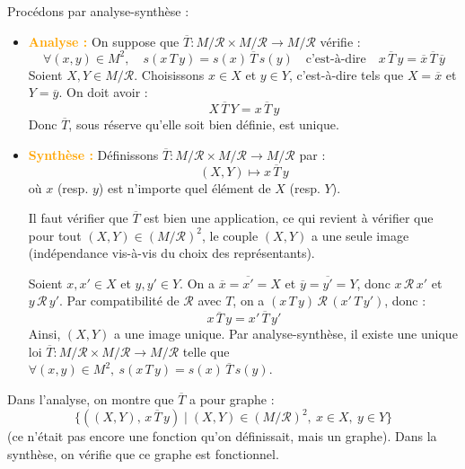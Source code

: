 \documentclass[a4paper,11pt]{article}
\newcommand{\cas}[1]{\textbf{\textcolor{orange}{#1}}}
\begin{document}
\begin{demonstration}
Procédons par analyse-synthèse :
\begin{itemize}
    \item \cas{Analyse :} On suppose que $\overline{T} : M / \mathcal{R} \times M / \mathcal{R} \to M / \mathcal{R}$ vérifie :
    \[
    \forall (x, y) \in M^2, \quad s(x \, T \, y) = s(x) \, \overline{T} \, s(y) \quad \text{c'est-à-dire} \quad \overline{x \, T \, y} = \overline{x} \, \overline{T} \, \overline{y}
    \]
    Soient $X, Y \in M / \mathcal{R}$. Choisissons $x \in X$ et $y \in Y$, c'est-à-dire tels que $X = \overline{x}$ et $Y = \overline{y}$.
    On doit avoir :
    \[
    X \, \overline{T} \, Y = \overline{x \, T \, y}
    \]
    Donc $\overline{T}$, sous réserve qu'elle soit bien définie, est unique.

    \item \cas{Synthèse :} Définissons $\overline{T} : M / \mathcal{R} \times M / \mathcal{R} \to M / \mathcal{R}$ par :
    \[
    (X, Y) \longmapsto \overline{x \, T \, y}
    \]
    où $x$ (resp. $y$) est n'importe quel élément de $X$ (resp. $Y$).

    Il faut vérifier que $\overline{T}$ est bien une application, ce qui revient à vérifier que pour tout $(X, Y) \in (M / \mathcal{R})^2$, le couple $(X, Y)$ a une seule image (indépendance vis-à-vis du choix des représentants).
    
    Soient $x, x' \in X$ et $y, y' \in Y$. On a $\overline{x} = \overline{x'} = X$ et $\overline{y} = \overline{y'} = Y$, donc $x \, \mathcal{R} \, x'$ et $y \, \mathcal{R} \, y'$.
    Par compatibilité de $\mathcal{R}$ avec $T$, on a $(x \, T \, y) \, \mathcal{R} \, (x' \, T \, y')$, donc :
    \[
    \overline{x \, T \, y} = \overline{x' \, T \, y'}
    \]
    Ainsi, $(X, Y)$ a une image unique. Par analyse-synthèse, il existe une unique loi $\overline{T} : M / \mathcal{R} \times M / \mathcal{R} \to M / \mathcal{R}$ telle que $\forall (x, y) \in M^2, \ s(x \, T \, y) = s(x) \, \overline{T} \, s(y)$.
\end{itemize}
\end{demonstration}

\begin{remarque}[NB]
Dans l'analyse, on montre que $\overline{T}$ a pour graphe :
\[
\big\{ ((X, Y), \, \overline{x \, T \, y}) \mid (X, Y) \in (M / \mathcal{R})^2, \ x \in X, \ y \in Y \big\}
\]
(ce n'était pas encore une fonction qu'on définissait, mais un graphe). Dans la synthèse, on vérifie que ce graphe est fonctionnel.
\end{remarque}
\end{document}
